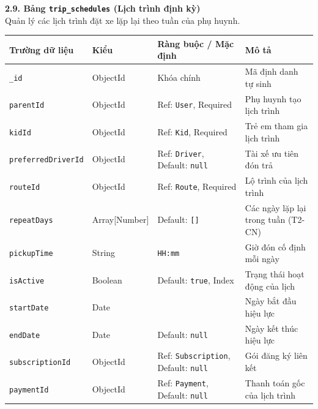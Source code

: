 \documentclass[../DoAn.tex]{subfiles}
\begin{document}
\textbf{2.9. Bảng \texttt{trip\_schedules} (Lịch trình định kỳ)} \\
Quản lý các lịch trình đặt xe lặp lại theo tuần của phụ huynh.
\begin{table}[H]
    \centering
    \begin{tabular}{|l|l|p{4cm}|p{5cm}|}
        \hline
        \textbf{Trường dữ liệu}    & \textbf{Kiểu} & \textbf{Ràng buộc / Mặc định}                      & \textbf{Mô tả}                      \\ \hline
        \texttt{\_id}              & ObjectId      & Khóa chính                                         & Mã định danh tự sinh                \\ \hline
        \texttt{parentId}          & ObjectId      & Ref: \texttt{User}, Required                       & Phụ huynh tạo lịch trình            \\ \hline
        \texttt{kidId}             & ObjectId      & Ref: \texttt{Kid}, Required                        & Trẻ em tham gia lịch trình          \\ \hline
        \texttt{preferredDriverId} & ObjectId      & Ref: \texttt{Driver}, Default: \texttt{null}       & Tài xế ưu tiên đón trả              \\ \hline
        \texttt{routeId}           & ObjectId      & Ref: \texttt{Route}, Required                      & Lộ trình của lịch trình             \\ \hline
        \texttt{repeatDays}        & Array[Number] & Default: \texttt{[]}                               & Các ngày lặp lại trong tuần (T2-CN) \\ \hline
        \texttt{pickupTime}        & String        & \texttt{HH:mm}                                     & Giờ đón cố định mỗi ngày            \\ \hline
        \texttt{isActive}          & Boolean       & Default: \texttt{true}, Index                      & Trạng thái hoạt động của lịch       \\ \hline
        \texttt{startDate}         & Date          &                                                    & Ngày bắt đầu hiệu lực               \\ \hline
        \texttt{endDate}           & Date          & Default: \texttt{null}                             & Ngày kết thúc hiệu lực              \\ \hline
        \texttt{subscriptionId}    & ObjectId      & Ref: \texttt{Subscription}, Default: \texttt{null} & Gói đăng ký liên kết                \\ \hline
        \texttt{paymentId}         & ObjectId      & Ref: \texttt{Payment}, Default: \texttt{null}      & Thanh toán gốc của lịch trình       \\ \hline
    \end{tabular}
\end{table}
\end{document}
